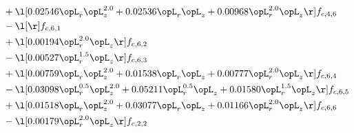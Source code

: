 \begin{alignat}{2}
& + \l[  0.02546 \opL_r \opL_z^{2.0} +  0.02536 \opL_r \opL_z +  0.00968 \opL_r^{2.0} \opL_z  \r] f_{c,4,6} \nonumber \\ 
& - \l[  \r] f_{c,6,1} \nonumber \\ 
& + \l[  0.00194 \opL_r^{2.0} \opL_z  \r] f_{c,6,2} \nonumber \\ 
& - \l[  0.00527 \opL_r^{1.5} \opL_z  \r] f_{c,6,3} \nonumber \\ 
& + \l[  0.00759 \opL_r \opL_z^{2.0} +  0.01538 \opL_r \opL_z +  0.00777 \opL_r^{2.0} \opL_z  \r] f_{c,6,4} \nonumber \\ 
& - \l[  0.03098 \opL_r^{0.5} \opL_z^{2.0} +  0.05211 \opL_r^{0.5} \opL_z +  0.01580 \opL_r^{1.5} \opL_z  \r] f_{c,6,5} \nonumber \\ 
& + \l[  0.01518 \opL_r \opL_z^{2.0} +  0.03077 \opL_r \opL_z +  0.01166 \opL_r^{2.0} \opL_z  \r] f_{c,6,6} \nonumber \\ 
& - \l[  0.00179 \opL_r^{2.0} \opL_z  \r] f_{c,2,2} \nonumber \\ 
\end{alignat} 


